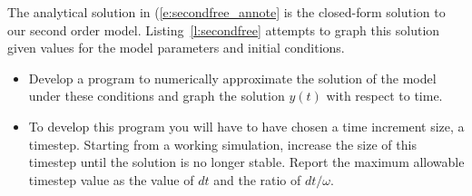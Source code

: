 \begin{ex}
The analytical solution in (\ref{e:secondfree_annote} is the closed-form solution to our second order model.  Listing~\ref{l:secondfree} attempts to graph this solution given values for the model parameters and initial conditions.
\begin{itemize}
\item Develop a program to numerically approximate the solution of the model under these conditions and graph the solution $y(t)$ with respect to time.
\item To develop this program you will have to have chosen a time increment size, a timestep.  Starting from a working simulation, increase the size of this timestep until the solution is no longer stable.  Report the maximum allowable timestep value as the value of $dt$ and the ratio of $dt/\omega$.
\end{itemize}
\end{ex}







